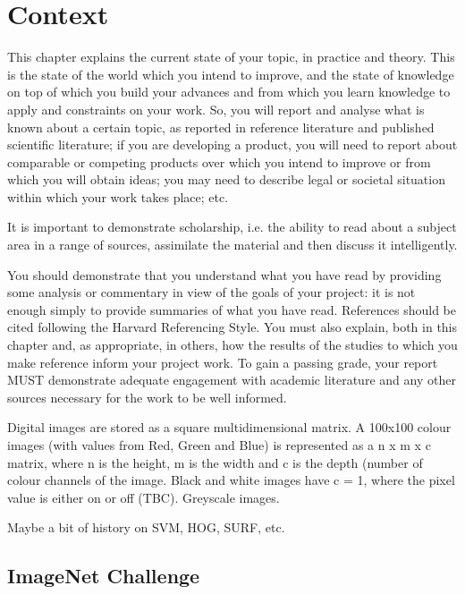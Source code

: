 
\chapter{Context}

\label{Context} 

This chapter explains the current state of your topic, in practice and theory. This is the state of the world which you intend to improve, and the state of knowledge on top of which you build your advances and from which you learn knowledge to apply and constraints on your work. So, you will report and analyse what is known about a certain topic, as reported in reference literature and published scientific literature; if you are developing a product, you will need to report about comparable or competing products over which you intend to improve or from which you will obtain ideas; you may need to describe legal or societal situation within which your work takes place; etc.  
  
It is important to demonstrate scholarship, i.e. the ability to read about a subject area in a range of sources, assimilate the material and then discuss it intelligently.  
  
You should demonstrate that you understand what you have read by providing some analysis or commentary in view of the goals of your project: it is not enough simply to provide summaries of what you have read. References should be cited following the Harvard Referencing Style. You must also explain, both in this chapter and, as appropriate, in others, how the results of the studies to which you make reference inform your project work. To gain a passing grade, your report MUST demonstrate adequate engagement with academic literature and any other sources necessary for the work to be well informed.  

Digital images are stored as a square multidimensional matrix. A 100x100 colour images (with values from Red, Green and Blue) is represented as a n x m x c matrix, where n is the height, m is the width and c is the depth (number of colour channels of the image. Black and white images have c = 1, where the pixel value is either on or off (TBC). Greyscale images.  

Maybe a bit of history on SVM, HOG, SURF, etc.  



\section{ImageNet Challenge}

